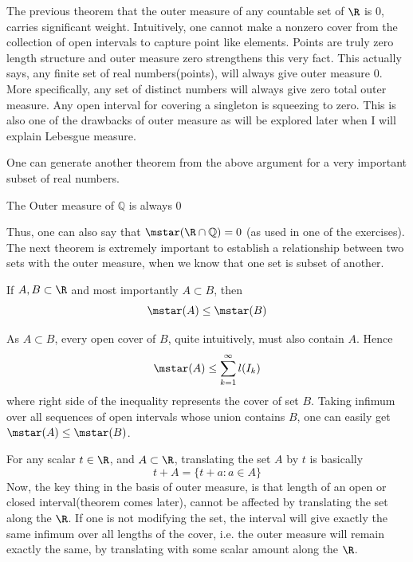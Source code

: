 \begin{concept}
    The previous theorem that the outer measure of any countable set of $\R$ is 0, carries significant weight. Intuitively, one cannot make a nonzero cover from the collection of open intervals to capture point like elements. Points are truly zero length structure and outer measure zero strengthens this very fact. This actually says, any finite set of real numbers(points), will always give outer measure 0. More specifically, any set of distinct numbers will always give zero total outer measure. Any open interval for covering a singleton is squeezing to zero. This is also one of the drawbacks of outer measure as will be explored later when I will explain Lebesgue measure. 
\end{concept}
One can generate another theorem from the above argument for a very important subset of real numbers.
\begin{theorem}
    The Outer measure of $\mathbb{Q}$ is always 0
\end{theorem}
Thus, one can also say that $\mstar(\R\cap \mathbb{Q})=0$ (as used in one of the exercises). 
The next theorem is extremely important to establish a relationship between two sets with the outer measure, when we know that one set is subset of another.
\begin{theorem}
    If $A, B \subset \R$ and most importantly $A \subset B$, then 
    \[
    \mstar(A) \leq \mstar(B)
    \]
\end{theorem}
\begin{proofsketch}
    As $A \subset B$, every open cover of $B$, quite intuitively, must also contain $A$. Hence
    \[
    \mstar(A) \leq \sum_{k=1}^\infty l(I_k)
    \]
    where right side of the inequality represents the cover of set $B$. Taking infimum over all sequences of open intervals whose union contains $B$, one can easily get $\mstar(A) \leq \mstar(B)$.
\end{proofsketch}
\begin{definition}
    For any scalar $t\in \R$, and $A \subset \R$, translating the set $A$ by $t$ is basically
    \[
    t+A = \{t+a:a\in A\}
    \]
    Now, the key thing in the basis of outer measure, is that length of an open or closed interval(theorem comes later), cannot be affected by translating the set along the $\R$. If one is not modifying the set, the interval will give exactly the same infimum over all lengths of the cover, i.e. the outer measure will remain exactly the same, by translating with some scalar amount along the $\R$. 
\end{definition}
